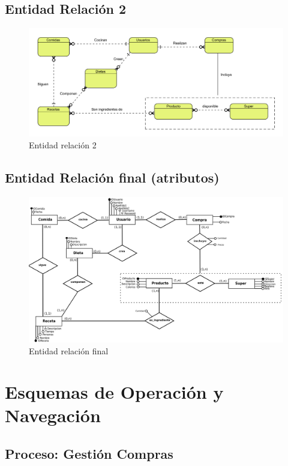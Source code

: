 \documentclass[a4paper,12pt]{report}
\begin{document}
\section{Entidad Relación 2}
\label{sec-6-3}
\begin{figure}[!htp]
\centering
\includegraphics[width=0.8\linewidth]{./refinamientos/er2.png}
\caption{Entidad relación 2}
\label{fig:Entidad relación 2}
\medskip
\footnotesize
{}
\end{figure}
\section{Entidad Relación final (atributos)}
\label{sec-6-4}
\begin{figure}[!htp]
\centering
\includegraphics[width=0.9\linewidth]{./refinamientos/erfinal.png}
\caption{Entidad relación final}
\label{fig:Entidad relación final}
\medskip
\footnotesize
{}
\end{figure}
\chapter{Esquemas de Operación y Navegación}
\label{sec-7}
\section{Proceso: Gestión Compras}
\label{sec-7-1}
\end{document}
